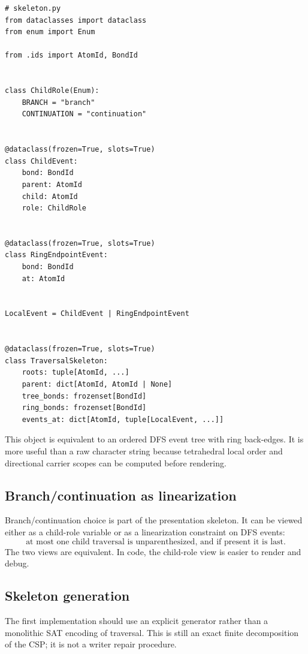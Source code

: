 \documentclass[10pt,a4paper]{article}
\theoremstyle{definition}
\theoremstyle{remark}
\begin{document}
\begin{lstlisting}
# skeleton.py
from dataclasses import dataclass
from enum import Enum

from .ids import AtomId, BondId


class ChildRole(Enum):
    BRANCH = "branch"
    CONTINUATION = "continuation"


@dataclass(frozen=True, slots=True)
class ChildEvent:
    bond: BondId
    parent: AtomId
    child: AtomId
    role: ChildRole


@dataclass(frozen=True, slots=True)
class RingEndpointEvent:
    bond: BondId
    at: AtomId


LocalEvent = ChildEvent | RingEndpointEvent


@dataclass(frozen=True, slots=True)
class TraversalSkeleton:
    roots: tuple[AtomId, ...]
    parent: dict[AtomId, AtomId | None]
    tree_bonds: frozenset[BondId]
    ring_bonds: frozenset[BondId]
    events_at: dict[AtomId, tuple[LocalEvent, ...]]
\end{lstlisting}

This object is equivalent to an ordered DFS event tree with ring back-edges.  It
is more useful than a raw character string because tetrahedral local order and
directional carrier scopes can be computed before rendering.

\subsection{Branch/continuation as linearization}

Branch/continuation choice is part of the presentation skeleton.  It can be
viewed either as a child-role variable or as a linearization constraint on DFS
events:
\[
   \text{at most one child traversal is unparenthesized, and if present it is last.}
\]
The two views are equivalent.  In code, the child-role view is easier to render
and debug.

\subsection{Skeleton generation}

The first implementation should use an explicit generator rather than a
monolithic SAT encoding of traversal.  This is still an exact finite
decomposition of the CSP; it is not a writer repair procedure.
\end{document}
